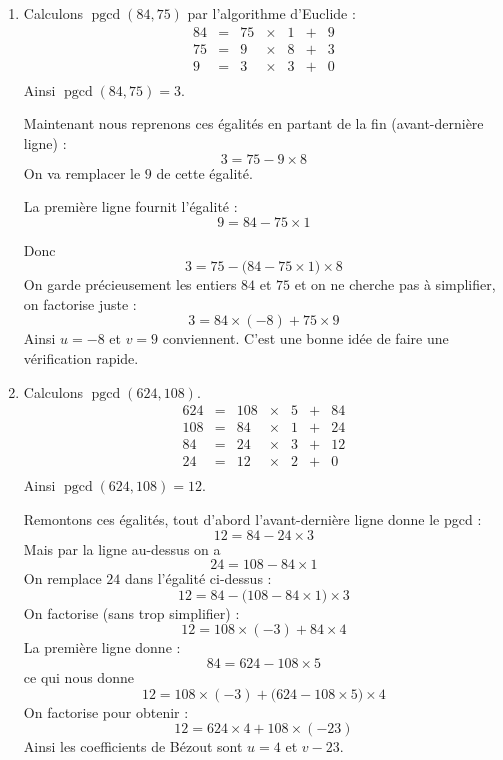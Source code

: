 \documentclass[11pt,class=report,crop=false]{standalone}
\newcommand{\pgcd}{\mathop{\mathrm{pgcd}}\nolimits}
\begin{document}
\begin{enumerate}
    \item   
    Calculons $\pgcd(84,75)$ par l'algorithme d'Euclide :
    $$
    \begin{array}{rclclcl}
    84 & = & 75 & \times & 1 & + & 9 \\
    75 & = & 9  & \times & 8 & + & \boxed{3} \\
    9  & = & 3  & \times & 3 & + & 0 \\
    \end{array}
    $$
    Ainsi $\pgcd(84,75) = 3$.
    
    Maintenant nous reprenons ces égalités en partant de la fin (avant-dernière ligne) :
    $$\boxed{3} = 75 - 9 \times 8$$
    On va remplacer le $9$ de cette égalité.
    
    La première ligne fournit l'égalité :
    $$9 = 84 -75 \times 1$$
    
    Donc 
    $$\boxed{3} = 75 - \big(84 -75 \times 1 \big) \times 8$$
    On garde précieusement les entiers $84$ et $75$ et on ne cherche pas à simplifier, on factorise juste :
    $$\boxed{3} = 84 \times (-8)  + 75 \times 9$$
    Ainsi $u=-8$ et $v=9$ conviennent. C'est une bonne idée de faire une vérification rapide.
    
    
    \item 
    Calculons $\pgcd(624,108)$.
    $$
    \begin{array}{rclclcl}
    624 & = & 108 & \times & 5 & + & 84 \\
    108 & = & 84  & \times & 1 & + & 24 \\
    84 & = & 24  & \times & 3 & + & \boxed{12} \\
    24 & = & 12  & \times & 2 & + & 0  \\
    \end{array}
    $$
    Ainsi $\pgcd(624,108) = 12$. 
    
    Remontons ces égalités, tout d'abord l'avant-dernière ligne donne le pgcd :
    $$\boxed{12} = 84 -24 \times 3$$
    Mais par la ligne au-dessus on a 
    $$24 = 108 - 84 \times 1$$
    On remplace $24$ dans l'égalité ci-dessus :
    $$\boxed{12} = 84 - \big( 108 - 84 \times 1\big)\times 3$$
    On factorise (sans trop simplifier) :
    $$\boxed{12} = 108 \times (-3)  + 84 \times 4$$
    La première ligne donne :
    $$84 = 624 - 108 \times 5$$
    ce qui nous donne
    $$\boxed{12} = 108 \times (-3)  + \big( 624 - 108 \times 5 \big) \times 4$$
    On factorise pour obtenir :
    $$\boxed{12} = 624 \times 4 + 108 \times (-23)$$
    Ainsi les coefficients de Bézout sont $u=4$ et $v-23$.
    
    
\end{enumerate}
\fincorrection
\finexercice
\end{document}
